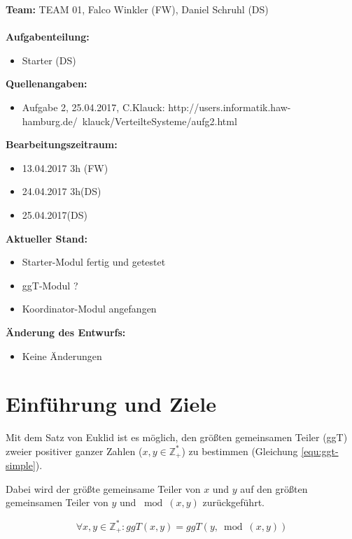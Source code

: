 \documentclass{article}
\begin{document}
\textbf{Team:} TEAM 01, Falco Winkler (FW), Daniel Schruhl (DS)\\
\\
\textbf{Aufgabenteilung:}
\begin{itemize}
    \item Starter (DS)
\end{itemize}

\textbf{Quellenangaben:}
\begin{itemize}
    \item Aufgabe 2, 25.04.2017, C.Klauck: \newline
    http://users.informatik.haw-hamburg.de/~klauck/VerteilteSysteme/aufg2.html
\end{itemize}

\textbf{Bearbeitungszeitraum:}
\begin{itemize}
	\item 13.04.2017 3h (FW)
	\item 24.04.2017 3h(DS)
	\item 25.04.2017(DS)
\end{itemize}

\textbf{Aktueller Stand:}
\begin{itemize}
	\item Starter-Modul fertig und getestet
	\item ggT-Modul ?
	\item Koordinator-Modul angefangen
\end{itemize}

\textbf{Änderung des Entwurfs:}
\begin{itemize}
    \item Keine Änderungen
\end{itemize}

\newpage

\section{Einführung und Ziele}
Mit dem Satz von Euklid ist es möglich, den größten gemeinsamen Teiler (ggT) zweier positiver ganzer Zahlen
($x,y \in \mathbb{Z}^{*}_{+}$) zu bestimmen (Gleichung \ref{equ:ggt-simple}).

Dabei wird der größte gemeinsame Teiler von $x$ und $y$ auf den größten gemeinsamen Teiler von $y$ und $\bmod{(x,y)}$
zurückgeführt.

\begin{equation}
\forall x,y \in \mathbb{Z}^{*}_{+}: ggT(x,y) = ggT(y,\bmod{(x,y)})
\label{equ:ggt-simple}
\end{equation}
\end{document}
